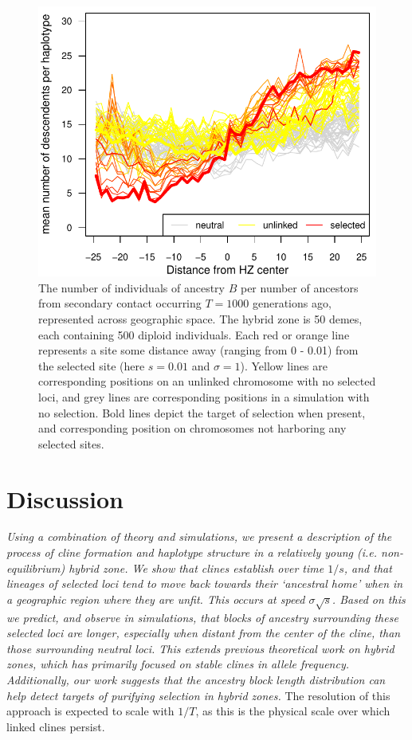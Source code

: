 \documentclass[11pt,letterpaper]{article}
\newcommand{\alisa}[1]{{\em \color{red} #1}}
\begin{document}
\begin{figure}
\includegraphics{figs/number_of_ancestors_tau1000}
\caption{The number of individuals of ancestry $B$ per number of ancestors from secondary contact occurring $T=1000$ generations ago, represented across geographic space. The hybrid zone is 50 demes, each containing 500 diploid individuals.
 Each red or orange line represents a site some distance away (ranging from 0 - 0.01) from the selected site (here $s=0.01$ and $\sigma=1$). Yellow lines are corresponding positions on an unlinked chromosome with no selected loci, and grey lines are corresponding positions in a simulation with no selection.  Bold lines depict the target of selection when present, and corresponding position on chromosomes not harboring any selected sites.}\label{Fig:family_size}
\end{figure}


\section*{Discussion}

\alisa{Using a combination of theory and simulations, we present a description of the process of cline formation and haplotype structure in a relatively young (i.e. non-equilibrium) hybrid zone.
We show that clines establish over time $1/s$, and that lineages of selected loci tend to move back towards their `ancestral home' when in a geographic region where they  are unfit. 
This occurs at speed $\sigma\sqrt{s}$. Based on this we predict, and observe in simulations, that blocks of ancestry surrounding these selected loci are longer, especially when distant from the center of the cline, than those surrounding neutral loci. 
This extends previous theoretical work on hybrid zones, which has primarily focused on stable clines in allele frequency. 
Additionally, our work suggests that the ancestry block length distribution can help detect targets of purifying selection in hybrid zones.}  
The resolution of this approach is expected to scale with $1/T$, as this is the physical scale over which linked clines persist.  
\end{document}

